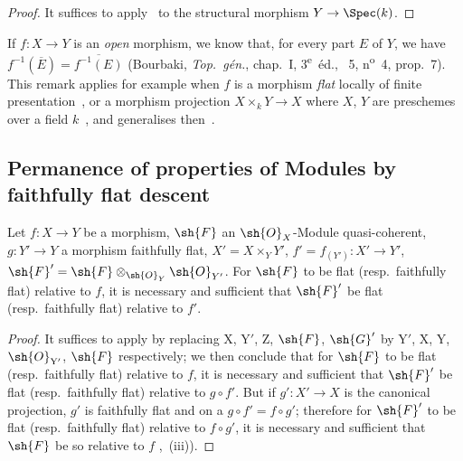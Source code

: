 \begin{proof}
It suffices to apply~ to the structural morphism $Y\to\Spec(k)$.
\end{proof}

\begin{remark}[2.4.11]
\label{IV.2.4.11}
If $f:X\to Y$ is an \emph{open} morphism, we know that, for every part $E$ of $Y$, we have $f^{-1}(\overline{E})=\overline{f^{-1}(E)}$ (Bourbaki, \emph{Top.~g\'{e}n.}, chap.~I, 3\textsuperscript{e}~\'{e}d., \textsection~5, n\textsuperscript{o}~4, prop.~7).
This remark applies for example when $f$ is a morphism \emph{flat} locally of finite presentation~, or a morphism projection $X\times_k Y\to X$ where $X$, $Y$ are preschemes over a field $k$~, and generalises then~.
\end{remark}

\subsection{Permanence of properties of Modules by faithfully flat descent}
\label{subsection:IV.2.5}

\begin{proposition}[2.5.1]
\label{IV.2.5.1}
Let $f:X\to Y$ be a morphism, $\sh{F}$ an $\sh{O}_X$-Module quasi-coherent,
$g:Y'\to Y$ a morphism faithfully flat, $X'=X\times_Y Y'$, $f'=f_{(Y')}:X'\to Y'$, $\sh{F}'=\sh{F}\otimes_{\sh{O}_Y}\sh{O}_{Y'}$.
For $\sh{F}$ to be flat \textnormal{(}resp.\ faithfully flat\textnormal{)} relative to $f$, it is necessary and sufficient that $\sh{F}'$ be flat
\textnormal{(}resp.\ faithfully flat\textnormal{)} relative to $f'$.
\end{proposition}

\begin{proof}
It suffices to apply  by replacing $\mathrm{X}$, $\mathrm{Y}'$, $\mathrm{Z}$, $\sh{F}$, $\sh{G}'$ by $\mathrm{Y}'$, $\mathrm{X}$, $\mathrm{Y}$, $\sh{O}_{\mathrm{Y}'}$, $\sh{F}$
respectively; we then conclude that for $\sh{F}$ to be flat (resp.\ faithfully flat) relative
to $f$, it is necessary and sufficient that $\sh{F}'$ be flat (resp.\ faithfully flat) relative to $g\circ f'$.
But if $g':X'\to X$ is the canonical projection, $g'$ is faithfully flat  and
on a $g\circ f'=f\circ g'$; therefore for $\sh{F}'$ to be flat (resp.\ faithfully flat) relative to $f\circ g'$,
it is necessary and sufficient that $\sh{F}$ be so relative to $f$ ,~(iii)).
\end{proof}

